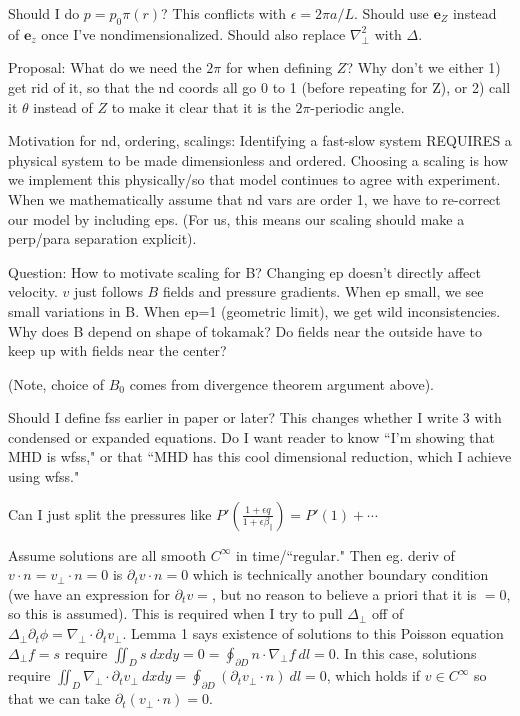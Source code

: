 \documentclass{article}
\newcommand{\para}{\parallel}
\newcommand{\ep}{\epsilon}
\newcommand{\np}{\nabla_\perp}
\newcommand{\lap}{\Delta_\perp}
\newcommand{\p}{\partial}
\newcommand{\fr}{\frac{1+\ep q}{1+\ep\beta_\para}}
\begin{document}
Should I do $p=p_0\pi(r)$? This conflicts with $\ep=2\pi a/L$. Should use $\bm{e}_Z$ instead of $\bm{e}_z$ once I've nondimensionalized. Should also replace $\np^2$ with $\Delta$. 

Proposal: What do we need the $2\pi$ for when defining $Z$? Why don't we either 1) get rid of it, so that the nd coords all go 0 to 1 (before repeating for Z), or 2) call it $\theta$ instead of $Z$ to make it clear that it is the $2\pi$-periodic angle. 

Motivation for nd, ordering, scalings: Identifying a fast-slow system REQUIRES a physical system to be made dimensionless and ordered. Choosing a scaling is how we implement this physically/so that model continues to agree with experiment. When we mathematically assume that nd vars are order 1, we have to re-correct our model by including eps. (For us, this means our scaling should make a perp/para separation explicit). 

Question: How to motivate scaling for B? Changing ep doesn't directly affect velocity. $v$ just follows $B$ fields and pressure gradients. 
When ep small, we see small variations in B. When ep=1 (geometric limit), we get wild inconsistencies. Why does B depend on shape of tokamak? Do fields near the outside have to keep up with fields near the center? 

(Note, choice of $B_0$ comes from divergence theorem argument above). 

Should I define fss earlier in paper or later? This changes whether I write 3 with condensed or expanded equations. Do I want reader to know ``I'm showing that MHD is wfss," or that ``MHD has this cool dimensional reduction, which I achieve using wfss." 

Can I just split the pressures like $P'(\fr) = P'(1) + \cdots$ 

Assume solutions are all smooth $C^\infty$ in time/``regular." Then eg. deriv of $v\cdot n=v_\perp\cdot n=0$ is $\p_t v\cdot n=0$ which is technically another boundary condition (we have an expression for $\p_t v=$, but no reason to believe a priori that it is $=0$, so this is assumed). This is required when I try to pull $\lap$ off of $\lap\p_t\phi = \np\cdot\p_tv_\perp$. Lemma 1 says existence of solutions to this Poisson equation $\lap f=s$ require $\iint_D s\ dxdy=0 = \oint_{\p D} n\cdot\np f\ dl =0$. In this case, solutions require $\iint_D \np\cdot\p_t v_\perp\ dxdy = \oint_{\p D} (\p_tv_\perp \cdot n)\ dl =0$, which holds if $v\in C^\infty$ so that we can take $\p_t (v_\perp \cdot n) = 0$. 
\end{document}

